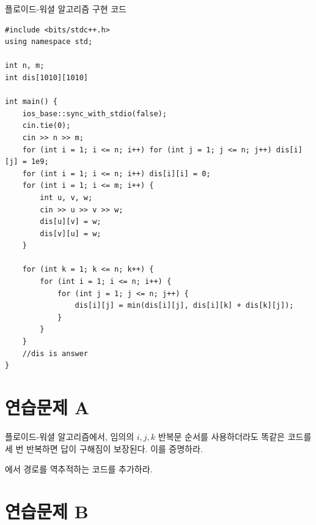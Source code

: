 \begin{code} \label{code: Floyd-Warshall}   
플로이드-워셜 알고리즘 구현 코드
\begin{lstlisting}
#include <bits/stdc++.h>
using namespace std;

int n, m;
int dis[1010][1010]

int main() {
    ios_base::sync_with_stdio(false);
    cin.tie(0);
    cin >> n >> m;
    for (int i = 1; i <= n; i++) for (int j = 1; j <= n; j++) dis[i][j] = 1e9;
    for (int i = 1; i <= n; i++) dis[i][i] = 0;
    for (int i = 1; i <= m; i++) {
        int u, v, w;
        cin >> u >> v >> w;
        dis[u][v] = w;
        dis[v][u] = w;
    }
    
    for (int k = 1; k <= n; k++) {
        for (int i = 1; i <= n; i++) {
            for (int j = 1; j <= n; j++) {
                dis[i][j] = min(dis[i][j], dis[i][k] + dis[k][j]);
            }
        }
    }
    //dis is answer
}
\end{lstlisting}
\end{code}

\section{연습문제 A}
\begin{problem}
    플로이드-워셜 알고리즘에서, 임의의 $i, j, k$ 반복문 순서를 사용하더라도 똑같은 코드를 세 번 반복하면 답이 구해짐이 보장된다. 이를 증명하라.
\end{problem}
\begin{problem}
    에서 경로를 역추적하는 코드를 추가하라.
\end{problem}

\section{연습문제 B}

